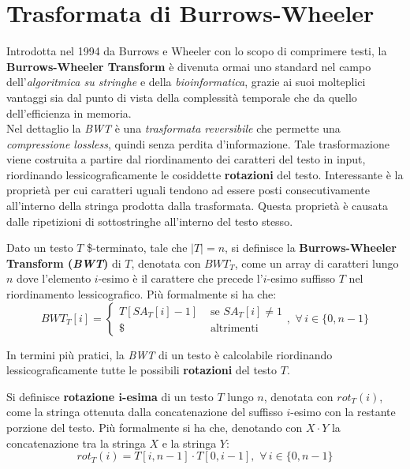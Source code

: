 \section{Trasformata di Burrows-Wheeler}
\label{secbwt}
Introdotta nel 1994 da Burrows e Wheeler con lo scopo di comprimere testi, la
\textbf{Burrows-Wheeler Transform} \cite{bwt} è divenuta ormai uno standard nel
campo dell'\textit{algoritmica su stringhe} e della \textit{bioinformatica},
grazie ai suoi molteplici vantaggi sia dal punto di vista della complessità
temporale che da quello dell'efficienza in memoria.\\
Nel dettaglio la \textit{BWT} è una \textit{trasformata reversibile} che
permette una \textit{compressione lossless}, quindi senza perdita
d'informazione. Tale trasformazione viene costruita a partire dal riordinamento
dei caratteri del testo in input, riordinando lessicograficamente le cosiddette
\textbf{rotazioni} del testo. Interessante è la proprietà per cui caratteri
uguali tendono ad essere posti consecutivamente all'interno della stringa
prodotta dalla trasformata. Questa proprietà è causata dalle ripetizioni di
sottostringhe all'interno del testo stesso.
\begin{definizione}
  Dato un testo $T$ \$-terminato, tale che $|T|=n$, si definisce la
  \textbf{Burrows-Wheeler Transform (\textit{BWT})} di $T$, denotata con
  $BWT_T$, come un array di caratteri lungo $n$ dove l'elemento $i$-esimo è il
  carattere che precede l'$i$-esimo suffisso $T$ nel riordinamento
  lessicografico. Più formalmente si ha che:
  \begin{equation}
    \label{eq:bwt1}
    BWT_T[i]=
    \begin{cases}
      T[SA_T[i]-1]&\mbox{ se } SA_T[i]\neq 1\\
      \$&\mbox{ altrimenti}
    \end{cases},\,\, \forall\, i\in\{0,n-1\}
  \end{equation}
  
\end{definizione}
In termini più pratici, la \textit{BWT} di un testo è calcolabile riordinando
lessicograficamente tutte le possibili \textbf{rotazioni} del testo $T$.
\begin{definizione}
  Si definisce \textbf{rotazione $\mathbf{i}$-esima} di
  un testo $T$ lungo $n$, denotata con $rot_T(i)$, come la stringa ottenuta
  dalla concatenazione 
  del suffisso $i$-esimo con la restante porzione del testo. Più formalmente si
  ha che, denotando con $X\cdot Y$ la concatenazione tra
  la stringa $X$ e la stringa $Y$:
  \begin{equation}
    \label{eq:bwt2}
    rot_T(i)=T[i,n-1]\cdot T[0,i-1],\,\,\forall\, i\in\{0,n-1\}
  \end{equation}
\end{definizione}

